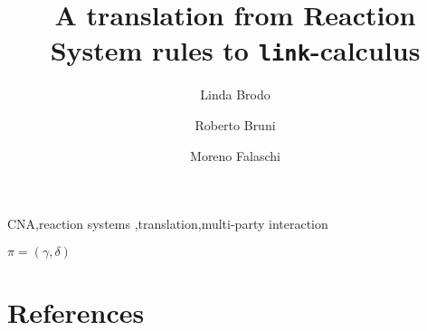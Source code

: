 \documentclass[review]{elsarticle}
\begin{document}
\begin{frontmatter}

\title{A translation from Reaction System rules to {\tt link}-calculus}



\author[uniss]{Linda Brodo}

\author[unipi]{Roberto Bruni}

\author[unisi]{Moreno Falaschi}

\address[unipi]{Dipartimento di Informatica, Universit\`{a} di Pisa, Italy}
\address[uniss]{di Scienze economiche e aziendali,   Universit\`a di Sassari, Italy}
\address[unisi]{Dipartimento di Ingegneria,   Universit\`a di Siena, Italy}



%

\begin{keyword}
 CNA\sep reaction systems \sep translation\sep multi-party interaction 
\end{keyword}

\end{frontmatter}

\linenumbers
$\pi =(\gamma,\delta)$ 


%




%
\section{References}


%
\end{document}
